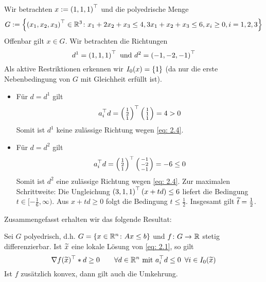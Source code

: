 \begin{beispiel} %
	Wir betrachten $x \mathrel{:=} \left( 1,1,1 \right)^{\top}$ und die polyedrische Menge
	\begin{equation*}
		 G \mathrel{:=} \left\{ \left( x_1,x_2,x_3 \right)^{\top} \in \mathbb{R}^3 \colon x_1 + 2x_2 + x_3 \le 4, 3x_1 + x_2 + x_3 \le 6, x_i \ge 0, i=1,2,3 \right\}
	\end{equation*}
	Offenbar gilt $x \in G$. Wir betrachten die Richtungen
	\begin{equation*}
		d^1 = \left( 1,1,1 \right)^{\top} \text{ und } d^2 = \left( -1,-2,-1 \right)^{\top}
	\end{equation*}
	Als aktive Restriktionen erkennen wir $I_0(x) = \left\{ 1 \right\}$ (da nur die erste Nebenbedingung von $G$ mit Gleichheit erfüllt ist).
	\begin{itemize}
		\item Für $d = d^1$ gilt
		\begin{equation*}
			a_i^{\top} d = \left( \begin{smallmatrix} 1 \\ 2 \\ 1	\end{smallmatrix} \right)^{\top} \left(\begin{smallmatrix} 1 \\ 1 \\ 1 \end{smallmatrix}\right) = 4 > 0
		\end{equation*}
		Somit ist $d^1$ keine zulässige Richtung wegen \eqref{eq: 2.4}.
		\item Für $d = d^2$ gilt
		\begin{equation*}
		a_i^{\top} d = \left( \begin{smallmatrix} 1 \\ 2 \\ 1	\end{smallmatrix} \right)^{\top} \left(\begin{smallmatrix} -1 \\ -2 \\ -1 \end{smallmatrix} \right) = -6 \le 0
		\end{equation*}
		Somit ist $d^2$ eine zulässige Richtung wegen \eqref{eq: 2.4}. Zur maximalen Schrittweite: Die Ungleichung $\left( 3,1,1 \right)^{\top}(x + td) \le 6$ liefert die Bedingung $t \in [-\frac{1}{6}, \infty)$. Aus $x+td \ge 0$ folgt die Bedingung $t \le \frac{1}{2}$. Insgesamt gilt $\widetilde{t} = \frac{1}{2}$.
	\end{itemize} 
\end{beispiel}

Zusammengefasst erhalten wir das folgende Resultat:

\begin{folgerung} %
	Sei $G$ polyedrisch, d.h. $G = \left\{ x \in \mathbb{R}^n \colon Ax \le b \right\}$ und $\abb{f}{G}{\R}$ stetig differenzierbar. Ist $\widetilde{x}$ eine lokale Lösung von \eqref{eq: 2.1}, so gilt 
	\begin{equation}
		\nabla f(\widetilde{x})^{\top} * d \ge 0 \qquad \forall d \in \mathbb{R}^n  \text{ mit } a_i^{\top} d \le 0 \enskip \forall i \in I_0(\widetilde{x}) \label{eq: 2.6}
	\end{equation}
	Ist $f$ zusätzlich konvex, dann gilt auch die Umkehrung.
\end{folgerung}